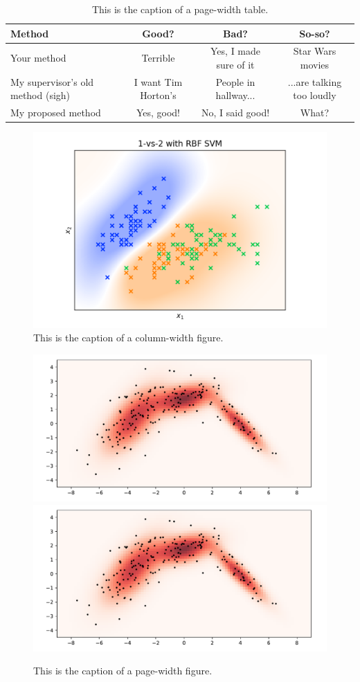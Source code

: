 \documentclass[10pt,twocolumn,letterpaper]{article}
\begin{document}
\begin{table}
   \begin{center}
   \begin{tabular}{|l|c|c|c|}
   \hline
   Method & Good? & Bad? & So-so? \\
   \hline\hline
   Your method & Terrible & Yes, I made sure of it & Star Wars movies \\
   My supervisor's old method (sigh) & I want Tim Horton's & People in hallway... & ...are talking too loudly \\
   My proposed method  & Yes, good! & No, I said good! & What? \\
   \hline
   \end{tabular}
   \end{center}
   \caption{This is the caption of a page-width table.\label{second_table}}
\end{table}


\begin{figure}
   \begin{center}
   \includegraphics[width=\linewidth]{sample_image.png}
   \end{center}
      \caption{This is the caption of a column-width figure.\label{first_figure}}
\end{figure}
   

\begin{figure}
   \begin{center}
      \includegraphics[width=0.4\linewidth]{sample_image.pdf}
      \includegraphics[width=0.4\linewidth]{sample_image.pdf}
   \end{center}
      \caption{This is the caption of a page-width figure.\label{second_figure}}
\end{figure}
\end{document}
